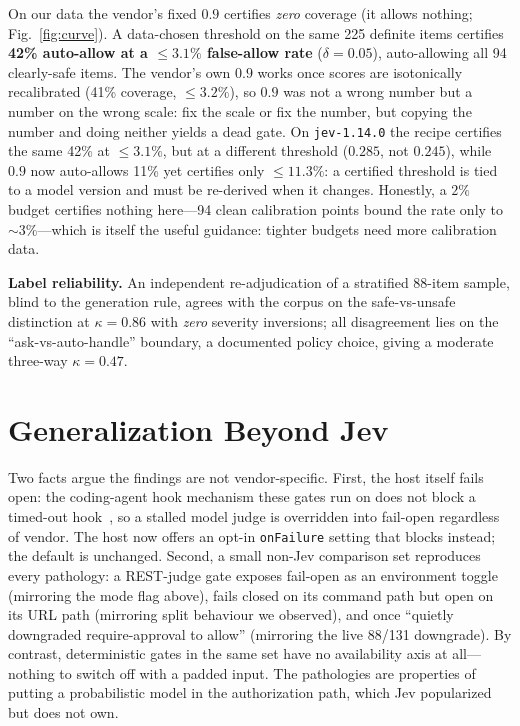 \documentclass[conference]{IEEEtran}
\newcommand{\code}[1]{\texttt{\small #1}}
\begin{document}
On our data the vendor's fixed $0.9$ certifies \emph{zero} coverage (it allows nothing;
Fig.~\ref{fig:curve}). A
data-chosen threshold on the same 225 definite items certifies \textbf{42\% auto-allow at a
$\leq 3.1\%$ false-allow rate} ($\delta=0.05$), auto-allowing all 94 clearly-safe items.
The vendor's own $0.9$ works once scores are isotonically recalibrated (41\% coverage,
$\leq 3.2\%$), so $0.9$ was not a wrong number but a number on the wrong scale: fix the scale
or fix the number, but copying the number and doing neither yields a dead gate. On
\code{jev-1.14.0} the recipe certifies the same 42\% at $\leq 3.1\%$, but at a different
threshold ($0.285$, not $0.245$), while $0.9$ now auto-allows 11\% yet certifies only
$\leq 11.3\%$: a certified threshold is tied to a model version and must be re-derived when
it changes. Honestly, a
$2\%$ budget certifies nothing here---94 clean calibration points bound the rate only to
${\sim}3\%$---which is itself the useful guidance: tighter budgets need more calibration
data.

\textbf{Label reliability.} An independent re-adjudication of a stratified 88-item sample,
blind to the generation rule, agrees with the corpus on the safe-vs-unsafe distinction at
$\kappa=0.86$ with \emph{zero} severity inversions; all disagreement lies on the
``ask-vs-auto-handle'' boundary, a documented policy choice, giving a moderate three-way
$\kappa=0.47$.

\section{Generalization Beyond Jev}
\label{sec:general}
Two facts argue the findings are not vendor-specific. First, the host itself fails open: the
coding-agent hook mechanism these gates run on does not block a timed-out
hook~\cite{cchooks}, so a stalled model judge is overridden into fail-open regardless of
vendor. The host now offers an opt-in \code{onFailure} setting that blocks instead; the default is unchanged. Second, a small non-Jev comparison set reproduces every pathology: a REST-judge gate
exposes fail-open as an environment toggle (mirroring the mode flag above), fails closed on
its command path but open on its URL path (mirroring split behaviour we observed), and once
``quietly downgraded require-approval to allow'' (mirroring the live 88/131 downgrade). By
contrast, deterministic gates in the same set have no availability axis at all---nothing to
switch off with a padded input. The pathologies are properties of putting a probabilistic
model in the authorization path, which Jev popularized but does not own.
\end{document}
